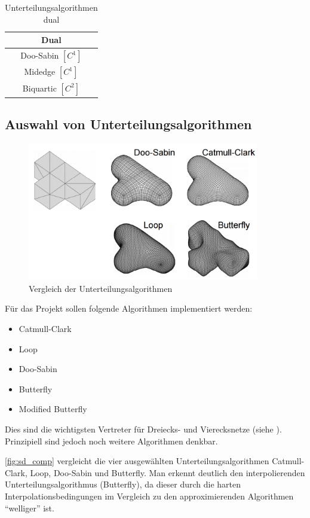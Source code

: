 \begin{table}
\center
\caption{Unterteilungsalgorithmen dual \cite[S. 65]{Zorin.subdivcourse}}
\label{tab:sd_comp_dual}
\begin{tabular}{c}
\\
\hline
\textbf{Dual}\\
\hline
Doo-Sabin \([C^1]\) \\
Midedge \([C^1]\) \\
Biquartic \([C^2]\) \\
\end{tabular}
\end{table}

\subsection{Auswahl von Unterteilungsalgorithmen}

\begin{figure}
  \centering
  \includegraphics[width=0.9\textwidth]{content/media/sd_overview.png}
  \caption{Vergleich der Unterteilungsalgorithmen \cite{Standford.24.07.2015}}
  \label{fig:sd_comp}
\end{figure}

Für das Projekt sollen folgende Algorithmen implementiert werden:
\begin{itemize}
	\item Catmull-Clark
	\item Loop
	\item Doo-Sabin
	\item Butterfly
	\item Modified Butterfly
\end{itemize}
Dies sind die wichtigsten Vertreter für Dreiecks- und Vierecksnetze
(siehe \cite[S. 65ff]{Zorin.subdivcourse} \cite{Zorin01aunified}).
Prinzipiell sind jedoch noch weitere Algorithmen denkbar.

\autoref{fig:sd_comp} vergleicht die vier ausgewählten
Unterteilungsalgorithmen Catmull-Clark, Loop, Doo-Sabin und Butterfly.
Man erkennt deutlich den interpolierenden Unterteilungsalgorithmus (Butterfly),
da dieser durch die harten Interpolationsbedingungen im
Vergleich zu den approximierenden Algorithmen \enquote{welliger} ist.
\cite{Zorin.subdivcourse}





